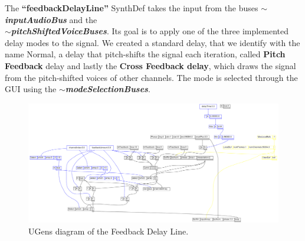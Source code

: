 \documentclass{article}
\begin{document}
The \textbf{“feedbackDelayLine”} SynthDef takes the input from the buses \textbf{\textit{$\sim$inputAudioBus}} and the\\ \textbf{\textit{$\sim$pitchShiftedVoiceBuses}}. Its goal is to apply one of the three implemented delay modes to the signal. We created a standard delay, that we identify with the name Normal, a delay that pitch-shifts the signal each iteration, called \textbf{Pitch Feedback} delay and  lastly the \textbf{Cross Feedback delay}, which draws the signal from the pitch-shifted voices of other channels. The mode is selected through the GUI using the \textbf{\textit{$\sim$modeSelectionBuses}}.

\begin{figure}[H]
\centering
    \hspace*{-20mm}\includegraphics[width=1.2\textwidth]{UGensFeedback.png}
    \caption{UGens diagram of the Feedback Delay Line.}
\end{figure}
\end{document}
